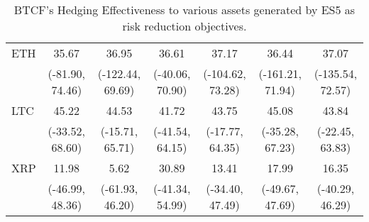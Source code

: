 \begin{table}[t]
{\begin{tabular}{lcccccc}
ETH     &             35.67 &             36.95 &             36.61 &             37.17 &             36.44 &             37.07 \\
        &   (-81.90, 74.46) &  (-122.44, 69.69) &   (-40.06, 70.90) &  (-104.62, 73.28) &  (-161.21, 71.94) &  (-135.54, 72.57) \\
LTC     &             45.22 &             44.53 &             41.72 &             43.75 &             45.08 &             43.84 \\
        &   (-33.52, 68.60) &   (-15.71, 65.71) &   (-41.54, 64.15) &   (-17.77, 64.35) &   (-35.28, 67.23) &   (-22.45, 63.83) \\
XRP     &             11.98 &              5.62 &             30.89 &             13.41 &             17.99 &             16.35 \\
        &   (-46.99, 48.36) &   (-61.93, 46.20) &   (-41.34, 54.99) &   (-34.40, 47.49) &   (-49.67, 47.69) &   (-40.29, 46.29) \\
\bottomrule
\end{tabular}}
\caption{BTCF's Hedging Effectiveness to various assets generated by ES5 as risk reduction objectives.}
\label{tab:ES5HE}
\end{table}